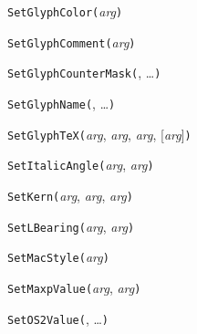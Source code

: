 \texttt{SetGlyphColor(}\textit{arg}\texttt{)}



\texttt{SetGlyphComment(}\textit{arg}\texttt{)}



\texttt{SetGlyphCounterMask(}, \ldots\texttt{)}



\texttt{SetGlyphName(}, \ldots\texttt{)}



\texttt{SetGlyphTeX(}\textit{arg}, \textit{arg}, \textit{arg}, [\textit{arg}]\texttt{)}



\texttt{SetItalicAngle(}\textit{arg}, \textit{arg}\texttt{)}



\texttt{SetKern(}\textit{arg}, \textit{arg}, \textit{arg}\texttt{)}



\texttt{SetLBearing(}\textit{arg}, \textit{arg}\texttt{)}



\texttt{SetMacStyle(}\textit{arg}\texttt{)}



\texttt{SetMaxpValue(}\textit{arg}, \textit{arg}\texttt{)}



\texttt{SetOS2Value(}, \ldots\texttt{)}



